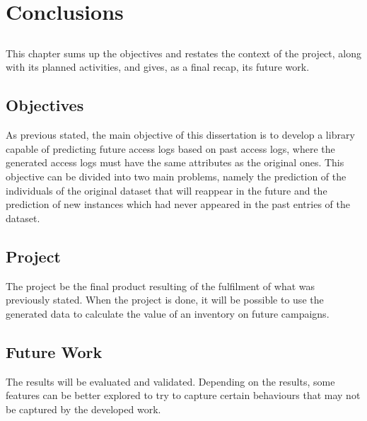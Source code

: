 \chapter{Conclusions}\label{chap:chap4}

\section*{}

This chapter sums up the objectives and restates the context of the project, along with its planned activities, and gives, as a final recap, its future work.

\section{Objectives}

As previous stated, the main objective of this dissertation is to develop a library capable of predicting future access logs based on past access logs,
where the generated access logs must have the same attributes as the original ones. This objective can be divided into two main problems, namely the
prediction of the individuals of the original dataset that will reappear in the future and the prediction of new instances which had never appeared
in the past entries of the dataset. 

\section{Project}

The project be the final product resulting of the fulfilment of what was previously stated. When the project is done, it will be possible to use the 
generated data to calculate the value of an inventory on future campaigns.

\section{Future Work}

The results will be evaluated and validated. Depending on the results, some features can be better explored to try
to capture certain behaviours that may not be captured by the developed work.
